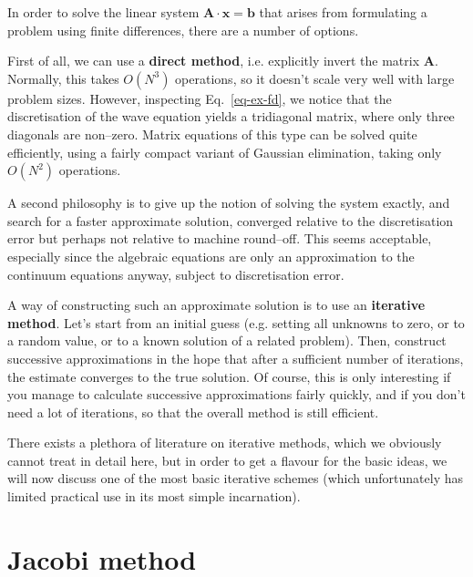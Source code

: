 \pagebreak




In order to solve the linear system ${\mathbf A}\cdot{\mathbf x}={\mathbf b}$ that arises from formulating a problem using finite differences, there are a number of options.

First of all, we can use a \textbf{direct method}, i.e. explicitly invert the matrix ${\mathbf A}$. Normally, this takes $O(N^3)$ operations, so it doesn't scale very well with large problem sizes. However, inspecting Eq.~\ref{eq-ex-fd}, we notice that the discretisation of the wave equation yields a tridiagonal matrix, where only three diagonals are non--zero. Matrix equations of this type can be solved quite efficiently, using a fairly compact variant of Gaussian elimination, taking only $O(N^2)$ operations.

A second philosophy is to give up the notion of solving the system exactly, and search for a faster approximate solution, converged relative to the discretisation error but perhaps not relative to machine round--off. This seems acceptable, especially since the algebraic equations are only an approximation to the continuum equations anyway, subject to discretisation error.

A way of constructing such an approximate solution is to use an \textbf{iterative method}. Let's start from an initial guess (e.g. setting all unknowns to zero, or to a random value, or to a known solution of a related problem). Then, construct successive approximations in the hope that after a sufficient number of iterations, the estimate converges to the true solution. Of course, this is only interesting if you manage to calculate successive approximations fairly quickly, and if you don't need a lot of iterations, so that the overall method is still efficient.

There exists a plethora of literature on iterative methods, which we obviously cannot treat in detail here, but in order to get a flavour for the basic ideas, we will now discuss one of the most basic iterative schemes (which unfortunately has limited practical use in its most simple incarnation).


\pagebreak

\section{Jacobi method}

